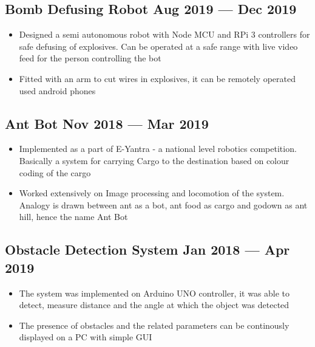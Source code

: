 \documentclass[a4,10pt]{article}
\newenvironment{zitemize}{
\begin{itemize}\itemsep0pt \parskip0pt \parsep1pt}
{\end{itemize}\vspace{-0.5cm}}
\begin{document}
\subsection*{Bomb Defusing Robot \hfill Aug 2019 --- Dec 2019} 
    \begin{zitemize}
        \item Designed a semi autonomous robot with Node MCU and RPi 3 controllers for safe defusing of explosives. Can be operated at a safe range with live video feed for the person controlling the bot
        \item Fitted with an arm to cut wires in explosives, it can be remotely operated used android phones
    \end{zitemize}


\subsection*{Ant Bot \hfill Nov 2018 --- Mar 2019} 
    \begin{zitemize}
        \item Implemented as a part of E-Yantra - a national level robotics competition. Basically a system for carrying Cargo to the destination based on colour coding of the cargo
        \item Worked extensively on Image processing and locomotion of the system. Analogy is drawn between ant as a bot, ant food as cargo and godown as ant hill, hence the name Ant Bot 
    \end{zitemize}
    
\subsection*{Obstacle Detection System \hfill Jan 2018 --- Apr 2019} 
    \begin{zitemize}
        \item The system was implemented on Arduino UNO controller, it was able to detect, measure distance and the angle at which the object was detected
        \item The presence of obstacles and the related parameters can be continously displayed on a PC with simple GUI
    \end{zitemize}
\end{document}
